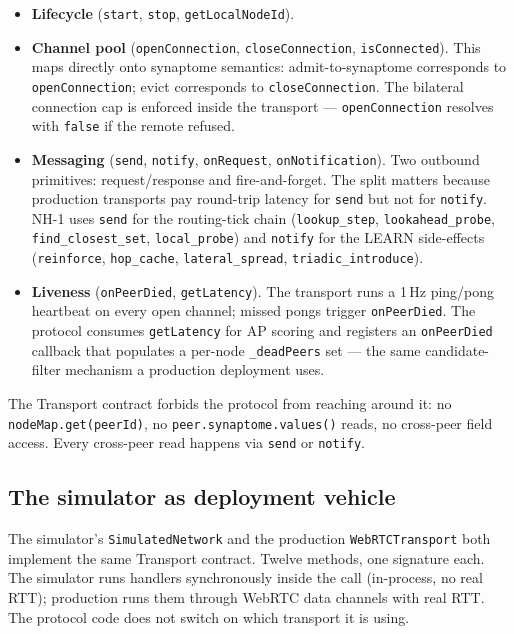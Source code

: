 \documentclass[conference]{IEEEtran}
\newcommand{\nhone}{NH-1\xspace}
\begin{document}
\begin{itemize}\itemsep2pt
\item \textbf{Lifecycle} (\texttt{start}, \texttt{stop},
  \texttt{getLocalNodeId}).
\item \textbf{Channel pool} (\texttt{openConnection},
  \texttt{closeConnection}, \texttt{isConnected}). This maps
  directly onto synaptome semantics: admit-to-synaptome corresponds
  to \texttt{openConnection}; evict corresponds to
  \texttt{closeConnection}. The bilateral connection cap is enforced
  inside the transport --- \texttt{openConnection} resolves with
  \texttt{false} if the remote refused.
\item \textbf{Messaging} (\texttt{send},
  \texttt{notify}, \texttt{onRequest}, \texttt{onNotification}).
  Two outbound primitives: request/response and fire-and-forget.
  The split matters because production transports pay round-trip
  latency for \texttt{send} but not for \texttt{notify}. \nhone
  uses \texttt{send} for the routing-tick chain
  (\texttt{lookup\_step}, \texttt{lookahead\_probe},
  \texttt{find\_closest\_set}, \texttt{local\_probe}) and
  \texttt{notify} for the LEARN side-effects (\texttt{reinforce},
  \texttt{hop\_cache}, \texttt{lateral\_spread},
  \texttt{triadic\_introduce}).
\item \textbf{Liveness} (\texttt{onPeerDied},
  \texttt{getLatency}). The transport runs a 1\,Hz ping/pong
  heartbeat on every open channel; missed pongs trigger
  \texttt{onPeerDied}. The protocol consumes \texttt{getLatency}
  for AP scoring and registers an \texttt{onPeerDied} callback
  that populates a per-node \texttt{\_deadPeers} set --- the same
  candidate-filter mechanism a production deployment uses.
\end{itemize}

The Transport contract forbids the protocol from reaching around
it: no \texttt{nodeMap.get(peerId)}, no
\texttt{peer.synaptome.values()} reads, no cross-peer field
access. Every cross-peer read happens via \texttt{send} or
\texttt{notify}.

\subsection{The simulator as deployment vehicle}

The simulator's \texttt{SimulatedNetwork} and the production
\texttt{WebRTCTransport} both implement the same Transport
contract. Twelve methods, one signature each. The simulator runs
handlers synchronously inside the call (in-process, no real RTT);
production runs them through WebRTC data channels with real RTT.
The protocol code does not switch on which transport it is using.
\end{document}
